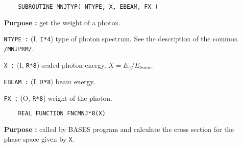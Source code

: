 \newlength{\MNJTYP}
\settowidth{\MNJTYP}{\tt    SUBROUTINE MNJTYP( NTYPE, X, EBEAM, FX )}
{ \samepage
\begin{verbatim}
    SUBROUTINE MNJTYP( NTYPE, X, EBEAM, FX )
\end{verbatim}
\vspace*{-28pt}
\hspace*{4ex}\fbox{\rule[14pt]{\MNJTYP}{0cm}}}
\begin{list}{ }{\parsep=0pt \itemsep=0pt \topsep=0pt }
\item[\bf Purpose :] get the weight of a photon.
\item[\tt NTYPE :] (I, {\tt I*4}) type of photon spectrum.  
See the description of the common {\tt /MNJPRM/}.
\item[\tt X :] (I, {\tt R*8}) scaled photon energy, 
$X = E_{\gamma}/E_{beam}$.
\item[\tt EBEAM :] (I, {\tt R*8}) beam energy.
\item[\tt FX :] (O, {\tt R*8}) weight of the photon.
\end{list}



\newlength{\FNCMNJ}
\settowidth{\FNCMNJ}{\tt REAL FUNCTION FNCMNJ*8(X)}
\begin{verbatim}
    REAL FUNCTION FNCMNJ*8(X)
\end{verbatim}
\vspace*{-28pt}
\hspace*{4ex}\fbox{\rule[14pt]{\FNCMNJ}{0cm}}
\begin{list}{ }{\parsep=0pt \itemsep=0pt \topsep=0pt }
\item[\bf Purpose :] called by BASES program and calculate the
cross section for the phase space given by {\tt X}.
\end{list}




